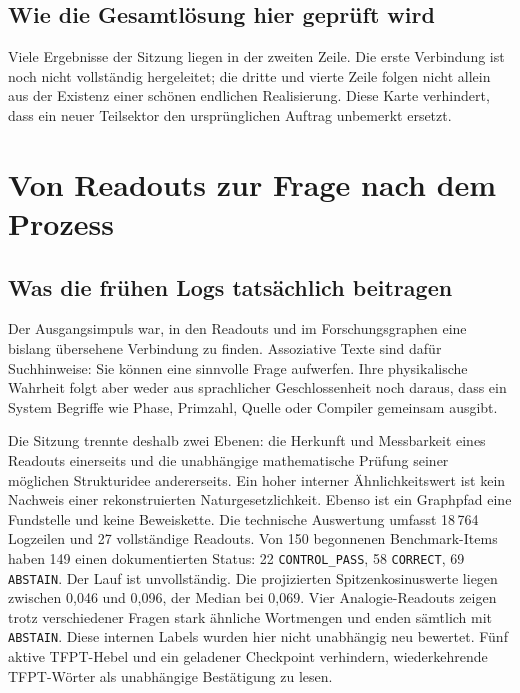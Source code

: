 \section{Wie die Gesamtlösung hier geprüft wird}
\begin{center}
\end{center}
Viele Ergebnisse der Sitzung liegen in der zweiten Zeile. Die erste Verbindung ist noch nicht vollständig hergeleitet; die dritte und vierte Zeile folgen nicht allein aus der Existenz einer schönen endlichen Realisierung. Diese Karte verhindert, dass ein neuer Teilsektor den ursprünglichen Auftrag unbemerkt ersetzt.

\chapter{Von Readouts zur Frage nach dem Prozess}
\section{Was die frühen Logs tatsächlich beitragen}
Der Ausgangsimpuls war, in den Readouts und im Forschungsgraphen eine bislang übersehene Verbindung zu finden. Assoziative Texte sind dafür Suchhinweise: Sie können eine sinnvolle Frage aufwerfen. Ihre physikalische Wahrheit folgt aber weder aus sprachlicher Geschlossenheit noch daraus, dass ein System Begriffe wie Phase, Primzahl, Quelle oder Compiler gemeinsam ausgibt.

Die Sitzung trennte deshalb zwei Ebenen: die Herkunft und Messbarkeit eines Readouts einerseits und die unabhängige mathematische Prüfung seiner möglichen Strukturidee andererseits. Ein hoher interner Ähnlichkeitswert ist kein Nachweis einer rekonstruierten Naturgesetzlichkeit. Ebenso ist ein Graphpfad eine Fundstelle und keine Beweiskette. Die technische Auswertung umfasst 18\,764 Logzeilen und 27 vollständige Readouts. Von 150 begonnenen Benchmark-Items haben 149 einen dokumentierten Status: 22 \texttt{CONTROL\_PASS}, 58 \texttt{CORRECT}, 69 \texttt{ABSTAIN}. Der Lauf ist unvollständig. Die projizierten Spitzenkosinuswerte liegen zwischen 0,046 und 0,096, der Median bei 0,069. Vier Analogie-Readouts zeigen trotz verschiedener Fragen stark ähnliche Wortmengen und enden sämtlich mit \texttt{ABSTAIN}. Diese internen Labels wurden hier nicht unabhängig neu bewertet. Fünf aktive TFPT-Hebel und ein geladener Checkpoint verhindern, wiederkehrende TFPT-Wörter als unabhängige Bestätigung zu lesen. 

